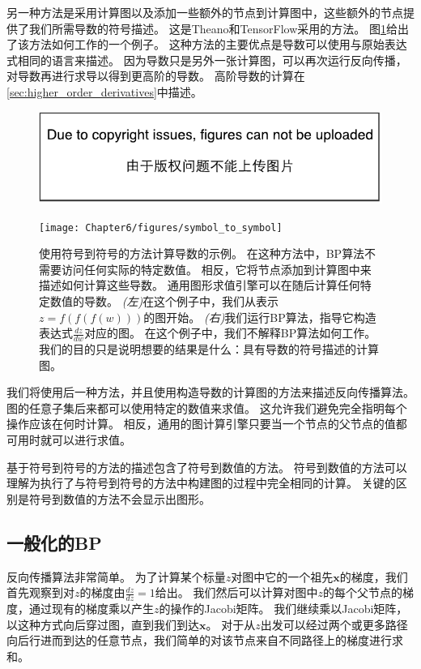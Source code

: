  
另一种方法是采用计算图以及添加一些额外的节点到计算图中，这些额外的节点提供了我们所需导数的符号描述。
这是Theano\citep{bergstra+al:2010-scipy-small,Bastien-Theano-2012}和TensorFlow\citep{tensorflow}采用的方法。
图\ref{fig:chap6_symbol_to_symbol}给出了该方法如何工作的一个例子。
这种方法的主要优点是导数可以使用与原始表达式相同的语言来描述。
因为导数只是另外一张计算图，可以再次运行反向传播，对导数再进行求导以得到更高阶的导数。
高阶导数的计算在\ref{sec:higher_order_derivatives}中描述。
\begin{figure}[!htb]
\ifOpenSource
\centerline{\includegraphics{figure.pdf}}
\else
\centerline{\texttt{[image: Chapter6/figures/symbol\_to\_symbol]}}
\fi
\captionsetup{singlelinecheck=off}
\caption{使用符号到符号的方法计算导数的示例。
在这种方法中，\gls{BP}算法不需要访问任何实际的特定数值。
相反，它将节点添加到计算图中来描述如何计算这些导数。
通用图形求值引擎可以在随后计算任何特定数值的导数。
\emph{(左)}在这个例子中，我们从表示$z=f(f(f(w)))$的图开始。
\emph{(右)}我们运行\gls{BP}算法，指导它构造表达式$\frac{dz}{dw}$对应的图。 在这个例子中，我们不解释\gls{BP}算法如何工作。
我们的目的只是说明想要的结果是什么：具有导数的符号描述的计算图。}
\label{fig:chap6_symbol_to_symbol}
\end{figure}

我们将使用后一种方法，并且使用构造导数的计算图的方法来描述反向传播算法。
图的任意子集后来都可以使用特定的数值来求值。
这允许我们避免完全指明每个操作应该在何时计算。
相反，通用的图计算引擎只要当一个节点的父节点的值都可用时就可以进行求值。

  
基于符号到符号的方法的描述包含了符号到数值的方法。
符号到数值的方法可以理解为执行了与符号到符号的方法中构建图的过程中完全相同的计算。
关键的区别是符号到数值的方法不会显示出图形。

\subsection{一般化的BP}
\label{sec:general_back_propagation}

反向传播算法非常简单。
为了计算某个标量$z$对图中它的一个祖先$\bm{x}$的梯度，我们首先观察到对$z$的梯度由$\frac{dz}{dz}=1$给出。
我们然后可以计算对图中$z$的每个父节点的梯度，通过现有的梯度乘以产生$z$的操作的Jacobi矩阵。
我们继续乘以Jacobi矩阵，以这种方式向后穿过图，直到我们到达$\bm{x}$。
对于从$z$出发可以经过两个或更多路径向后行进而到达的任意节点，我们简单的对该节点来自不同路径上的梯度进行求和。

